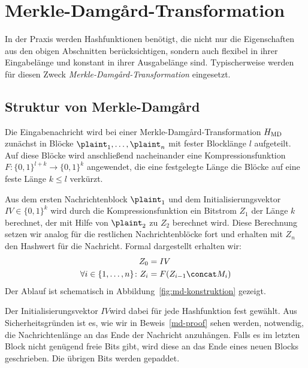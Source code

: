 \section{Merkle-Damgård-Transformation}
\label{ch:hash:merkledamgard}
In der Praxis werden Hashfunktionen benötigt, die nicht nur die
Eigenschaften aus den obigen Abschnitten berücksichtigen, sondern auch
flexibel in ihrer Eingabelänge und konstant in ihrer Ausgabelänge
sind. Typischerweise werden für diesen Zweck
\emph{Merkle-Damgård-Transformation} eingesetzt.

\subsection{Struktur von Merkle-Damgård}
Die Eingabenachricht wird bei einer Merkle-Damgård-Transformation
\indexMDTransformation $H_{\textnormal{MD}}$ zunächst in Blöcke
$\plaint_{1},\dots, \plaint_{n}$ mit fester Blocklänge $l$ aufgeteilt.
Auf diese Blöcke wird anschließend nacheinander eine
Kompressionsfunktion $F \colon \{0, 1\}^{l + k} \rightarrow \{0,1\}^{k}$
angewendet, die %
eine festgelegte Länge die Blöcke auf eine feste Länge $k \leq l$
verkürzt.

Aus dem ersten Nachrichtenblock $\plaint_{1}$ und dem
Initialisierungsvektor $IV \in \{0, 1\}^k$ wird durch die
Kompressionsfunktion ein Bitstrom $Z_1$ der Länge $k$ berechnet, der mit
Hilfe von $\plaint_2$ zu $Z_2$ berechnet wird. Diese Berechnung setzen
wir analog für die restlichen Nachrichtenblöcke fort und erhalten mit
$Z_{n}$ den Hashwert für die Nachricht. Formal dargestellt erhalten wir:
\begin{align*}
  Z_0 &= IV\\
  \forall i \in \{1,\dots, n\}\colon Z_{i} &= F(Z_{i-1} \concat M_{i})
\end{align*}
Der Ablauf ist schematisch in Abbildung~\ref{fig:md-konstruktion} gezeigt.

Der Initialisierungsvektor $IV$\indexIV wird dabei für jede
Hashfunktion fest gewählt. Aus Sicherheitsgründen ist es, wie wir in
Beweis~\ref{md-proof} sehen werden, notwendig, die Nachrichtenlänge an
das Ende der Nachricht anzuhängen. Falls es im letzten Block nicht
genügend freie Bits gibt, wird diese an das Ende eines neuen Blocks
geschrieben. Die übrigen Bits werden gepaddet.

